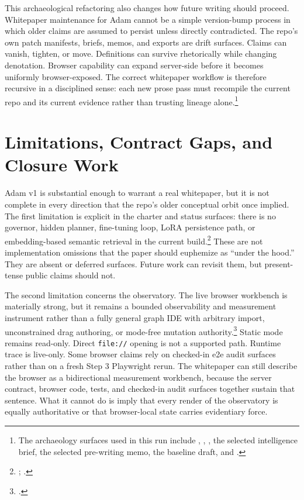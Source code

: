 \documentclass[10pt]{article}
\begin{document}
This archaeological refactoring also changes how future writing should proceed. Whitepaper maintenance for Adam cannot be a simple version-bump process in which older claims are assumed to persist unless directly contradicted. The repo's own patch manifests, briefs, memos, and exports are drift surfaces. Claims can vanish, tighten, or move. Definitions can survive rhetorically while changing denotation. Browser capability can expand server-side before it becomes uniformly browser-exposed. The correct whitepaper workflow is therefore recursive in a disciplined sense: each new prose pass must recompile the current repo and its current evidence rather than trusting lineage alone.\footnote{The archaeology surfaces used in this run include , , , the selected intelligence brief, the selected pre-writing memo, the baseline draft, and .}

\section{Limitations, Contract Gaps, and Closure Work}

Adam v1 is substantial enough to warrant a real whitepaper, but it is not complete in every direction that the repo's older conceptual orbit once implied. The first limitation is explicit in the charter and status surfaces: there is no governor, hidden planner, fine-tuning loop, LoRA persistence path, or embedding-based semantic retrieval in the current build.\footnote{; .} These are not implementation omissions that the paper should euphemize as ``under the hood.'' They are absent or deferred surfaces. Future work can revisit them, but present-tense public claims should not.

The second limitation concerns the observatory. The live browser workbench is materially strong, but it remains a bounded observability and measurement instrument rather than a fully general graph IDE with arbitrary import, unconstrained drag authoring, or mode-free mutation authority.\footnote{.} Static mode remains read-only. Direct \texttt{file://} opening is not a supported path. Runtime trace is live-only. Some browser claims rely on checked-in e2e audit surfaces rather than on a fresh Step 3 Playwright rerun. The whitepaper can still describe the browser as a bidirectional measurement workbench, because the server contract, browser code, tests, and checked-in audit surfaces together sustain that sentence. What it cannot do is imply that every render of the observatory is equally authoritative or that browser-local state carries evidentiary force.
\end{document}

